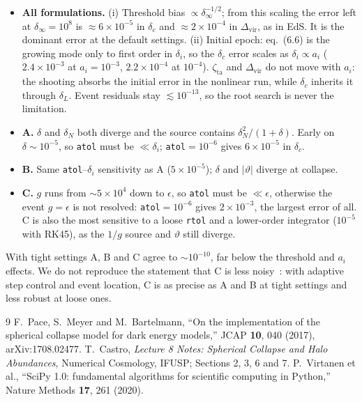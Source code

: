 \documentclass[11pt,a4paper]{article}
\newcommand{\res}{../results/exercise_4}
\begin{document}
\begin{table}[h]
  \centering
  \caption{Same as Table~\ref{tab:convdc} for $\Delta_{\mathrm{vir},m}$.}
  \label{tab:convD}
  
\end{table}

\begin{itemize}
  \item \textbf{All formulations.} (i) Threshold bias $\propto\delta_\infty^{-1/2}$; from this scaling the error left at $\delta_\infty=10^8$ is $\approx6\times10^{-5}$ in $\delta_c$ and $\approx2\times10^{-4}$ in $\Delta_\mathrm{vir}$, as in EdS. It is the dominant error at the default settings. (ii) Initial epoch: eq.~(6.6) is the growing mode only to first order in $\delta_i$, so the $\delta_c$ error scales as $\delta_i\propto a_i$ ($2.4\times10^{-3}$ at $a_i=10^{-3}$, $2.2\times10^{-4}$ at $10^{-4}$). $\zeta_\mathrm{ta}$ and $\Delta_\mathrm{vir}$ do not move with $a_i$: the shooting absorbs the initial error in the nonlinear run, while $\delta_c$ inherits it through $\delta_L$. Event residuals stay $\lesssim10^{-13}$, so the root search is never the limitation.
  \item \textbf{A.} $\delta$ and $\delta_N$ both diverge and the source contains $\delta_N^2/(1+\delta)$. Early on $\delta\sim10^{-5}$, so \texttt{atol} must be $\ll\delta_i$; \texttt{atol}$=10^{-6}$ gives $6\times10^{-5}$ in $\delta_c$.
  \item \textbf{B.} Same \texttt{atol}--$\delta_i$ sensitivity as A ($5\times10^{-5}$); $\delta$ and $|\vartheta|$ diverge at collapse.
  \item \textbf{C.} $g$ runs from $\sim5\times10^4$ down to $\epsilon$, so \texttt{atol} must be $\ll\epsilon$, otherwise the event $g=\epsilon$ is not resolved: \texttt{atol}$=10^{-6}$ gives $2\times10^{-3}$, the largest error of all. C is also the most sensitive to a loose \texttt{rtol} and a lower-order integrator ($10^{-5}$ with RK45), as the $1/g$ source and $\vartheta$ still diverge.
\end{itemize}
With tight settings A, B and C agree to $\sim10^{-10}$, far below the threshold and $a_i$ effects. We do not reproduce the statement that C is less noisy~\cite{pace2017}: with adaptive step control and event location, C is as precise as A and B at tight settings and less robust at loose ones.

\begin{thebibliography}{9}
   F.~Pace, S.~Meyer and M.~Bartelmann, ``On the implementation of the spherical collapse model for dark energy models,'' JCAP \textbf{10}, 040 (2017), arXiv:1708.02477.
   T.~Castro, \emph{Lecture 8 Notes: Spherical Collapse and Halo Abundances}, Numerical Cosmology, IFUSP; Sections 2, 3, 6 and 7.
   P.~Virtanen et al., ``SciPy 1.0: fundamental algorithms for scientific computing in Python,'' Nature Methods \textbf{17}, 261 (2020).
\end{thebibliography}
\end{document}
